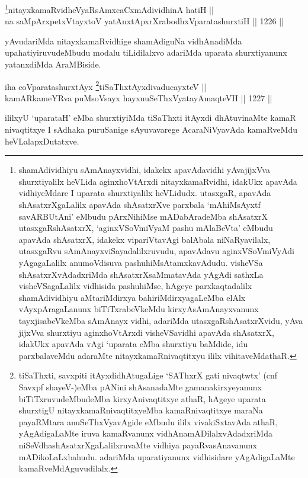\begin{shl}
\footnote{shamAdividhiyu sAmAnayxvidhi, idakekx apavAdavidhi yAvajijxVva shurxtiyalilx heVLida aginxhoVtArxdi nitayxkamaRvidhi, idakUkx apavAda vidhiyeMdare I uparata shurxtiyalilx heVLidudx. utasxgaR, apavAda shAsatxrXgaLalilx apavAda shAsatxrXve parxbala `mAhiMsAyxtf savARBUtAni' eMbudu pArxNihiMse mADabAradeMba shAsatxrX utasxgaRshAsatxrX, `aginxVSoVmiVyaM pashu mAlaBeVta' eMbudu apavAda shAsatxrX, idakekx vipariVtavAgi balAbala niNaRyavilalx, utasxgaRvu sAmAnayxviSayadalilxruvudu, apavAdavu aginxVSoVmiVyAdi yAgagaLalilx anumoVdisuva pashuhiMsAtamxkavAdudu. visheVSa shAsatxrXvAdadxriMda shAsatxrXsaMmatavAda yAgAdi sathxLa visheVSagaLalilx vidhisida pashuhiMse, hAgeye parxkaqtadalilx shamAdividhiyu aMtariMdirxya bahiriMdirxyagaLeMba elAlx vAyxpAragaLanunx biTiTxrabeVkeMdu kirxyAsAmAnayxvanunx tayxjisabeVkeMba sAmAnayx vidhi, adariMda utasxgaRshAsatxrXvidu, yAva jijxVva shurxtiyu aginxhoVtArxdi visheVSavidhi apavAda shAsatxrX, idakUkx apavAda vAgi `uparata eMba shurxtiyu baMdide, idu parxbalaveMdu adaraMte nitayxkamaRnivaqtitxyu  ililx vihitaveMdathaR.}nitayxkamaRvidheVyaRsAmxcaCxmAdividhinA hatiH || \\
na saMpArxpetxVtayxtoV yatAnxtApxrXrabodhxVparatashurxtiH \hfill || 1226 ||  
\end{shl}

\begin{artha}
yAvudariMda nitayxkamaRvidhige shamAdiguNa vidhAnadiMda upahatiyiruvudeMbudu modalu tiLidilalxvo adariMda uparata shurxtiyanunx yatanxdiMda AraMBiside.
\end{artha}


\begin{shl}
iha coVparatashurxtAyx \footnote{tiSaThxti, savxpiti itAyxdidhAtugaLige `SAThxrX gati nivaqtwtx' (cnf Savxpf shayeV-)eMba pANini shAsanadaMte gamanakirxyeyanunx biTiTxruvudeMbudeMba kirxyAnivaqtitxye athaR, hAgeye uparata shurxtigU nitayxkamaRnivaqtitxyeMba kamaRnivaqtitxye maraNa payaRMtara anuSeThxVyavAgide eMbudu ililx vivakiSxtavAda athaR, yAgAdigaLaMte iruva kamaRvanunx vidhAnamADilalxvAdadxriMda niSeVdhashAsatxrXgaLalilxruvaMte vidhiya payaRvasAnavanunx mADikoLaLxbahudu. adariMda uparatiyanunx vidhisidare yAgAdigaLaMte kamaRveMdAguvudilalx.}tiSaThxtAyxdivaducayxteV || \\
kamARkameYRva puMsoV\s sayx hayxnuSeThxVyatayA\s \s maqteVH \hfill || 1227 ||  
\end{shl}

\begin{artha}
ililxyU `uparataH' eMba shurxtiyiMda tiSaThxti itAyxdi dhAtuvinaMte kamaR nivaqtitxye I sAdhaka puruSanige sAyuvavarege AcaraNiVyavAda kamaRveMdu heVLalapxDutatxve.
\end{artha}

